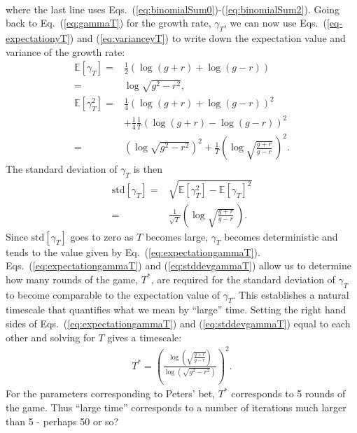 \documentclass[11pt]{article}
\begin{document}
\begin{multicols}{2}
\begin{align}
\end{align}
where the last line uses Eqs.~(\ref{eq:binomialSum0})-(\ref{eq:binomialSum2}).
Going back to Eq.~(\ref{eq:gammaT}) for the growth rate, $\gamma_T$, we can now use Eqs.~(\ref{eq-expectationyT}) and (\ref{eq:varianceyT}) to write down the expectation value and variance of the growth rate:
\begin{align}
\nonumber \mathbb{E}\left[ \gamma_T \right] = & \frac{1}{2} \left(\log (g+r) + \log (g-r)\right)\\
\label{eq:expectationgammaT} =& \log \sqrt{g^2 - r^2},\\
\nonumber \mathbb{E}\left[ \gamma_T^2 \right] = &  \frac{1}{4}  \left(\log (g+r) + \log (g-r)\right)^2\\
\nonumber & + \frac{1}{4}\frac{1}{T} \left(\log (g+r) - \log (g-r)\right)^2\\
\label{eq:variancegammaT} =&  \left(\log \sqrt{g^2 - r^2}\right)^2 + \frac{1}{T} \left( \log \sqrt{\frac{g+r}{g-r}}\,\right)^2.
\end{align}
The standard deviation of $\gamma_T$ is then
\begin{align}
\nonumber  \text{std}\left[ \gamma_T\right] = & \sqrt{ \mathbb{E}\left[\gamma_T^2 \right]  -  \mathbb{E}\left[\gamma_T \right]^2 }\\
\label{eq:stddevgammaT} = &  \frac{1}{\sqrt{T}} \left( \log \sqrt{\frac{g+r}{g-r}}\,\right).
\end{align}
Since $\text{std}\left[ \gamma_T\right]$ goes to zero as $T$ becomes large,  $\gamma_T$ becomes deterministic and tends to the value given by Eq.~(\ref{eq:expectationgammaT}).
Eqs.~(\ref{eq:expectationgammaT}) and (\ref{eq:stddevgammaT}) allow us to determine how many rounds of the game, $T^*$, are required for the standard deviation of $\gamma_T$ to become comparable to the expectation value of $\gamma_T$. This establishes a natural timescale that quantifies what we mean by ``large'' time.  Setting the right hand sides of Eqs.~(\ref{eq:expectationgammaT}) and (\ref{eq:stddevgammaT}) equal to each other and solving for $T$ gives a timescale:
\begin{align}
T^* = \left( \frac{\log\left(\sqrt{\frac{g+r}{g-r}}\right)}{ \log\left(\sqrt{g^2 - r^2} \right)}\right)^2.
\end{align}
For the parameters corresponding to Peters' bet, $T^*$ corresponds to 5 rounds of the game. Thus ``large time'' corresponds to a number of iterations much larger than 5 - perhaps 50 or so?


\end{multicols}
\end{document}
